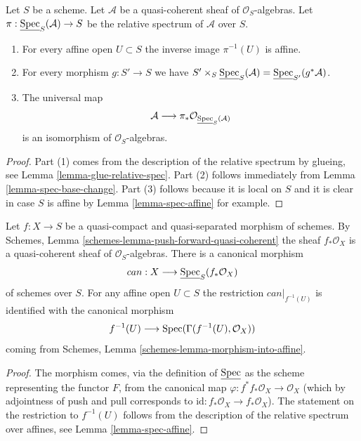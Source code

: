 \begin{lemma}
\label{lemma-spec-properties}
Let $S$ be a scheme. Let $\mathcal{A}$ be a quasi-coherent
sheaf of $\mathcal{O}_S$-algebras. Let
$\pi : \underline{\mathop{\mathrm{Spec}}}_S(\mathcal{A}) \to S$
be the relative spectrum of $\mathcal{A}$ over $S$.
\begin{enumerate}
\item For every affine open $U \subset S$ the inverse image
$\pi^{-1}(U)$ is affine.
\item For every morphism $g : S' \to S$ we have
$S' \times_S \underline{\mathop{\mathrm{Spec}}}_S(\mathcal{A}) =
\underline{\mathop{\mathrm{Spec}}}_{S'}(g^*\mathcal{A})$.
\item
The universal map
$$
\mathcal{A}
\longrightarrow
\pi_*\mathcal{O}_{\underline{\mathop{\mathrm{Spec}}}_S(\mathcal{A})}
$$
is an isomorphism of $\mathcal{O}_S$-algebras.
\end{enumerate}
\end{lemma}

\begin{proof}
Part (1) comes from the description of the relative spectrum
by glueing, see Lemma \ref{lemma-glue-relative-spec}.
Part (2) follows immediately from Lemma \ref{lemma-spec-base-change}.
Part (3) follows because it is local on $S$ and it is clear in case $S$
is affine by Lemma \ref{lemma-spec-affine} for example.
\end{proof}

\begin{lemma}
\label{lemma-canonical-morphism}
Let $f : X \to S$ be a quasi-compact and quasi-separated morphism
of schemes. By Schemes, Lemma \ref{schemes-lemma-push-forward-quasi-coherent}
the sheaf $f_*\mathcal{O}_X$ is a quasi-coherent sheaf of
$\mathcal{O}_S$-algebras. There is a canonical morphism
$$
can : X \longrightarrow \underline{\mathop{\mathrm{Spec}}}_S(f_*\mathcal{O}_X)
$$
of schemes over $S$.
For any affine open $U \subset S$ the restriction $can|_{f^{-1}(U)}$
is identified with the canonical morphism
$$
f^{-1}(U) \longrightarrow \mathop{\mathrm{Spec}}(\Gamma(f^{-1}(U), \mathcal{O}_X))
$$
coming from Schemes, Lemma \ref{schemes-lemma-morphism-into-affine}.
\end{lemma}

\begin{proof}
The morphism comes, via the definition of $\underline{\mathop{\mathrm{Spec}}}$
as the scheme representing the functor $F$, from the canonical map
$\varphi : f^*f_*\mathcal{O}_X \to \mathcal{O}_X$ (which by adjointness of
push and pull corresponds to
$\text{id} : f_*\mathcal{O}_X \to f_*\mathcal{O}_X$).
The statement on the restriction to $f^{-1}(U)$
follows from the description of the relative spectrum over
affines, see Lemma \ref{lemma-spec-affine}.
\end{proof}











